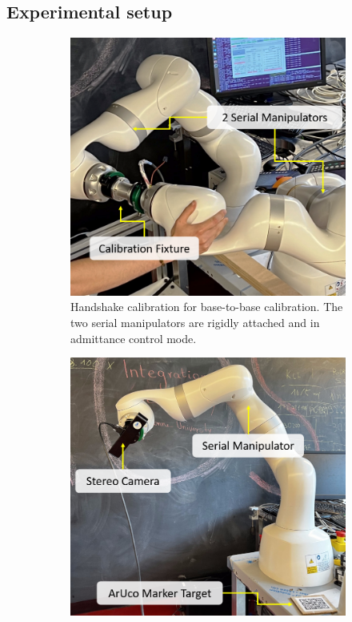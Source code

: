 \subsection{Experimental setup}
\label{c1:sec:experimental_setup}
\begin{figure}
     \centering
     \begin{subfigure}[b]{0.3\textwidth}
         \centering
         \includegraphics[width=\textwidth]{fig/handshake.png}
         \caption{Handshake calibration for base-to-base calibration. The two serial manipulators are rigidly attached and in admittance control mode.}
         \label{c1:fig:handshake}
     \end{subfigure}
     \hfill
     \begin{subfigure}[b]{0.3\textwidth}
         \centering
         \includegraphics[width=\textwidth]{fig/eye_in_hand.png}

\end{subfigure}
\end{figure}
